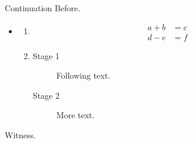 \documentclass[11pt]{beamer}
\begin{document}
\begin{frame}[t]{Continuation}
Before.\par
\begin{itemize}
\item<1-> \begin{enumerate}
\item<1-> \[\begin{aligned}a+b&=c\\ d-e&=f\end{aligned}\]
\item<2-> \begin{description}
\item[Stage 1] Following text.
\item[Stage 2] More text.
\end{description}
\end{enumerate}
\end{itemize}
Witness.\par
\end{frame}
\end{document}
